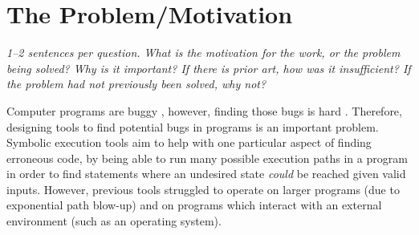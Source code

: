 \documentclass[11pt]{article}
\begin{document}
\begin{itemize}






\end{itemize}

\section*{The Problem/Motivation}

\textsl{1--2 sentences per question. What is the motivation for the work, or
the problem being solved? Why is it important? If there is prior art, how was
it insufficient? If the problem had not previously been solved, why not?}

Computer programs are buggy \cite{GitHubBugs}, however, finding those bugs is
hard \cite{FindingBugsHard}. Therefore, designing tools to find potential bugs
in programs is an important problem. Symbolic execution tools aim to help with
one particular aspect of finding erroneous code, by being able to run many
possible execution paths in a program in order to find statements where an
undesired state \textit{could} be reached given valid inputs. However, previous
tools struggled to operate on larger programs (due to exponential path blow-up)
and on programs which interact with an external environment (such as an
operating system).
\end{document}
